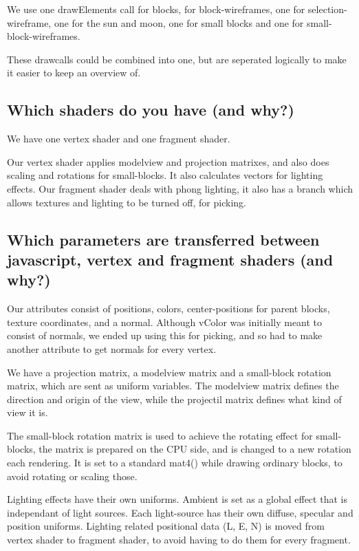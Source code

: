 We use one drawElements call for blocks, 
for block-wireframes, one for selection-wireframe, one for the sun and moon,
one for small blocks and one for small-block-wireframes.

These drawcalls could be combined into one, but are seperated logically 
to make it easier to keep an overview of.

\subsection{Which shaders do you have (and why?)}

We have one vertex shader and one fragment shader. 

Our vertex shader applies modelview and projection matrixes, 
and also does scaling and rotations for small-blocks. It also calculates vectors for lighting effects.
Our fragment shader deals with phong lighting, 
it also has a branch which allows textures and lighting to be turned off, for picking.

\subsection{Which parameters are transferred between javascript, 
vertex and fragment shaders (and why?)}

Our attributes consist of positions, colors, center-positions for parent blocks, texture coordinates, and a normal.
Although vColor was initially meant to consist of normals, we ended up using this for picking, 
and so had to make another attribute to get normals for every vertex.

We have a projection matrix, a modelview matrix and a small-block rotation matrix, which are sent as uniform variables.
The modelview matrix defines the direction and origin of the view, while the projectil matrix defines what kind of view it is.

The small-block rotation matrix is used to achieve the rotating effect for small-blocks, 
the matrix is prepared on the CPU side, and is changed to a new rotation each rendering.
It is set to a standard mat4() while drawing ordinary blocks, to avoid rotating or scaling those.

Lighting effects have their own uniforms. 
Ambient is set as a global effect that is independant of light sources.
Each light-source has their own diffuse, specular and position uniforms.
Lighting related positional data (L, E, N) is moved from vertex shader to fragment shader, 
to avoid having to do them for every fragment.

